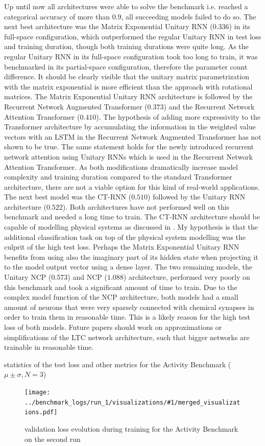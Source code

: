 \documentclass[draft,final]{vutinfth} %
\newcommand{\benchmarksummary}[2]{
    \begin{table}
        \centering{}
        \resizebox{\linewidth}{!}{\csvautotabular[options]{../benchmark_logs/statistics/#1.csv}}
        \caption{statistics of the test loss and other metrics for the #2 Benchmark ($\mu \pm \sigma, N=3$)}
        \label{tab:test_loss_#1}
    \end{table}
    \begin{figure}[h]
        \centering{}
        \texttt{[image: ../benchmark\_logs/run\_1/visualizations/\#1/merged\_visualizations.pdf]}
        \caption{validation loss evolution during training for the #2 Benchmark on the second run}
        \label{fig:validation_loss_#1}
    \end{figure}
    \clearpage{}
}
\begin{document}
    Up until now all architectures were able to solve the benchmark i.e. reached a categorical accuracy of more than $0.9$, all succeeding models failed to do so.
    The next best architecture was the Matrix Exponential Unitary RNN ($0.336$) in its full-space configuration, which outperformed the regular Unitary RNN in test loss and training duration, though both training durations were quite long.
    As the regular Unitary RNN in its full-space configuration took too long to train, it was benchmarked in its partial-space configuration, therefore the parameter count difference.
    It should be clearly visible that the unitary matrix parametrization with the matrix exponential is more efficient than the approach with rotational matrices.
    The Matrix Exponential Unitary RNN architecture is followed by the Recurrent Network Augmented Transformer ($0.373$) and the Recurrent Network Attention Transformer ($0.410$). 
    The hypothesis of adding more expressivity to the Transformer architecture by accumulating the information in the weighted value vectors with an LSTM in the Recurrent Network Augmented Transformer has not shown to be true.
    The same statement holds for the newly introduced recurrent network attention using Unitary RNNs which is used in the Recurrent Network Attention Transformer.
    As both modifications dramatically increase model complexity and training duration compared to the standard Transformer architecture, there are not a viable option for this kind of real-world applications.
    The next best model was the CT-RNN ($0.510$) followed by the Unitary RNN architecture ($0.522$).
    Both architectures have not  performed well on this benchmark and needed a long time to train.
    The CT-RNN architecture should be capable of modelling physical systems as discussed in .
    My hypothesis is that the additional classification task on top of the physical system modelling was the culprit of the high test loss.
    Perhaps the Matrix Exponential Unitary RNN benefits from using also the imaginary part of its hidden state when projecting it to the model output vector using a dense layer.
    The two remaining models, the Unitary NCP ($0.573$) and NCP ($1.088$) architecture, performed very poorly on this benchmark and took a significant amount of time to train.
    Due to the complex model function of the NCP architecture, both models had a small amount of neurons that were very sparsely connected with chemical synapses in order to train them in reasonable time.
    This is a likely reason for the high test loss of both models.
    Future papers should work on approximations or simplifications of the LTC network architecture, such that bigger networks are trainable in reasonable time.
    \benchmarksummary{activity}{Activity}
\end{document}
